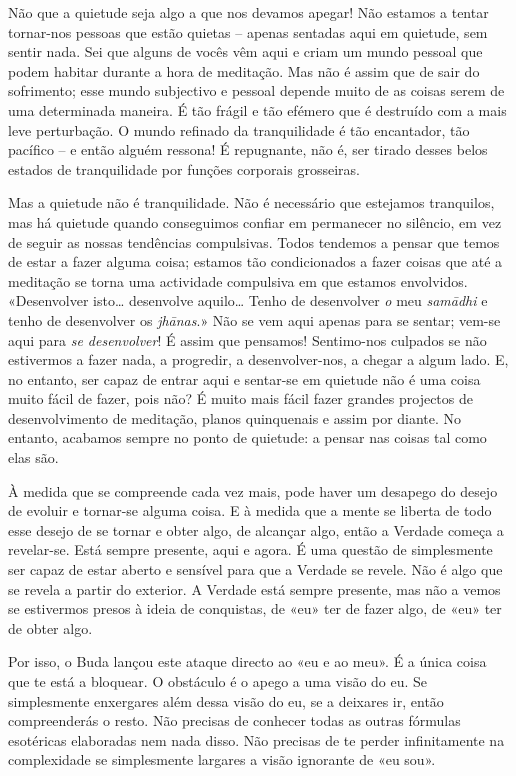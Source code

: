 Não que a quietude seja algo a que nos devamos apegar! Não estamos a tentar
tornar-nos pessoas que estão quietas -- apenas sentadas aqui em quietude, sem
sentir nada. Sei que alguns de vocês vêm aqui e criam um mundo pessoal que podem
habitar durante a hora de meditação. Mas não é assim que de sair do sofrimento;
esse mundo subjectivo e pessoal depende muito de as coisas serem de uma
determinada maneira. É tão frágil e tão efémero que é destruído com a mais leve
perturbação. O mundo refinado da tranquilidade é tão encantador, tão pacífico --
e então alguém ressona! É repugnante, não é, ser tirado desses belos estados de
tranquilidade por funções corporais grosseiras.

Mas a quietude não é tranquilidade. Não é necessário que estejamos tranquilos,
mas há quietude quando conseguimos confiar em permanecer no silêncio, em vez de
seguir as nossas tendências compulsivas. Todos tendemos a pensar que temos de
estar a fazer alguma coisa; estamos tão condicionados a fazer coisas que até a
meditação se torna uma actividade compulsiva em que estamos envolvidos.
«Desenvolver isto\ldots{} desenvolve aquilo\ldots{} Tenho de desenvolver
\emph{o} meu \emph{samādhi} e tenho de desenvolver os \emph{jhānas}.» Não se vem
aqui apenas para se sentar; vem-se aqui para \emph{se desenvolver}! É assim que
pensamos! Sentimo-nos culpados se não estivermos a fazer nada, a progredir, a
desenvolver-nos, a chegar a algum lado. E, no entanto, ser capaz de entrar aqui
e sentar-se em quietude não é uma coisa muito fácil de fazer, pois não? É muito
mais fácil fazer grandes projectos de desenvolvimento de meditação, planos
quinquenais e assim por diante. No entanto, acabamos sempre no ponto de
quietude: a pensar nas coisas tal como elas são.

À medida que se compreende cada vez mais, pode haver um desapego do desejo de
evoluir e tornar-se alguma coisa. E à medida que a mente se liberta de todo
esse desejo de se tornar e obter algo, de alcançar algo, então a Verdade começa
a revelar-se. Está sempre presente, aqui e agora. É uma questão de simplesmente
ser capaz de estar aberto e sensível para que a Verdade se revele. Não é algo
que se revela a partir do exterior. A Verdade está sempre presente, mas não a
vemos se estivermos presos à ideia de conquistas, de «eu» ter de fazer algo, de
«eu» ter de obter algo.

Por isso, o Buda lançou este ataque directo ao «eu e ao meu». É a única coisa
que te está a bloquear. O obstáculo é o apego a uma visão do eu. Se simplesmente
enxergares além dessa visão do eu, se a deixares ir, então compreenderás o
resto. Não precisas de conhecer todas as outras fórmulas esotéricas elaboradas
nem nada disso. Não precisas de te perder infinitamente na complexidade se
simplesmente largares a visão ignorante de «eu sou».

